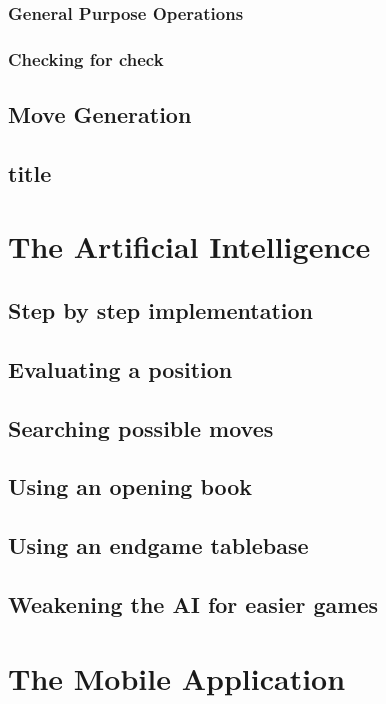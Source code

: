 \documentclass[11pt]{report}
\begin{document}
\subsection{General Purpose Operations}
\subsection{Checking for check}

\section{Move Generation}

\section{title}


\chapter{The Artificial Intelligence}

\section{Step by step implementation}

\section{Evaluating a position}

\section{Searching possible moves}

\section{Using an opening book}

\section{Using an endgame tablebase}

\section{Weakening the AI for easier games}


\chapter{The Mobile Application}
\end{document}
